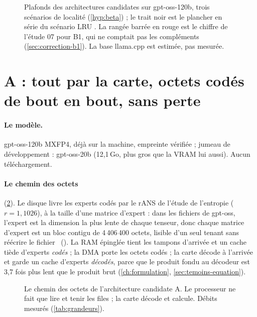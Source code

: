 \begin{figure}[ht]
\centering
\GrapheArchitectures
\caption[Plafonds des architectures candidates]{Plafonds des architectures candidates sur gpt-oss-120b, trois scénarios de localité (\cref{hyp:beta}) ; le trait noir est le plancher en série du scénario LRU \calc. La rangée barrée en rouge est le chiffre de l'étude 07 pour B1, qui ne comptait pas les compléments (\cref{sec:correction-b1}). La base llama.cpp est estimée, pas mesurée.}
\label{fig:architectures-plafonds}
\end{figure}

\section{A : tout par la carte, octets codés de bout en bout, sans perte}\label{sec:archi-a}

\paragraph{Le modèle.} gpt-oss-120b MXFP4, déjà sur la machine, empreinte vérifiée ; jumeau de développement : gpt-oss-20b (12,1\,Go, plus gros que la VRAM lui aussi). Aucun téléchargement.

\paragraph{Le chemin des octets} (\cref{fig:chemin-a}). Le disque livre les experts codés par le rANS de l'étude de l'entropie ($r = 1{,}1026$), à la taille d'une matrice d'expert : dans les fichiers de gpt-oss, l'expert est la dimension la plus lente de chaque tenseur, donc chaque matrice d'expert est un bloc contigu de 4\,406\,400 octets, lisible d'un seul tenant sans réécrire le fichier \mes~(). La RAM épinglée tient les tampons d'arrivée et un cache tiède d'experts \emph{codés} ; la DMA porte les octets codés ; la carte décode à l'arrivée et garde un cache d'experts \emph{décodés}, parce que le produit fondu au décodeur est 3,7 fois plus lent que le produit brut (\cref{ch:formulation}, \cref{sec:temoins-equation}).

\begin{figure}[ht]
\centering
\SchemaCheminA
\caption[Le chemin des octets de l'architecture A]{Le chemin des octets de l'architecture candidate A. Le processeur ne fait que lire et tenir les files ; la carte décode et calcule. Débits mesurés (\cref{tab:grandeurs}).}
\label{fig:chemin-a}
\end{figure}

